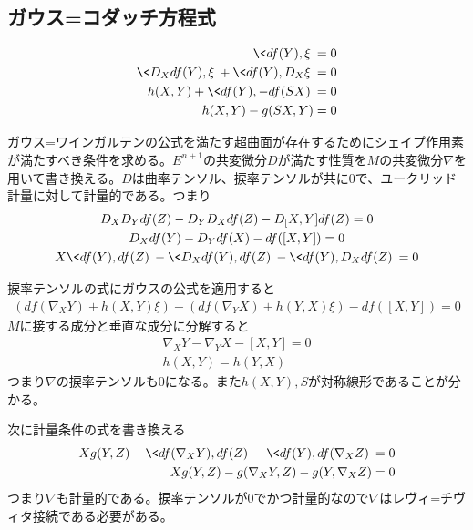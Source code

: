 \subsection{ガウス=コダッチ方程式}
    \begin{align*}
        \<df(Y), \xi\> = 0\\
        \<D_Xdf(Y), \xi\> + \<df(Y), D_X\xi\> = 0\\
        h(X, Y) + \<df(Y), -df(SX)\> = 0\\
        h(X, Y) - g(SX, Y) = 0
    \end{align*}

    ガウス=ワインガルテンの公式を満たす超曲面が存在するためにシェイプ作用素が満たすべき条件を求める。$E^{n+1}$の共変微分$D$が満たす性質を$M$の共変微分$\nabla$を用いて書き換える。$D$は曲率テンソル、捩率テンソルが共に0で、ユークリッド計量に対して計量的である。つまり
    \begin{gather*}
        D_XD_Ydf(Z) - D_YD_Xdf(Z) - D_[X, Y]df(Z) = 0\\
        D_Xdf(Y) - D_Ydf(X) - df([X, Y]) = 0\\
        X\<df(Y), df(Z)\> - \<D_Xdf(Y), df(Z)\> - \<df(Y), D_Xdf(Z)\> = 0\\
    \end{gather*}

    捩率テンソルの式にガウスの公式を適用すると
    \begin{align*}
        (df(\nabla_XY) + h(X, Y)\xi) - (df(\nabla_YX) + h(Y, X)\xi) - df([X, Y]) = 0
    \end{align*}
    $M$に接する成分と垂直な成分に分解すると
    \begin{gather*}
        \nabla_XY - \nabla_YX - [X, Y] = 0\\
        h(X, Y) = h(Y, X)
    \end{gather*}
    つまり$\nabla$の捩率テンソルも0になる。また$h(X, Y), S$が対称線形であることが分かる。

    次に計量条件の式を書き換える
    \begin{align*}
        Xg(Y, Z) - \<df(\nabla_XY), df(Z)\> - \<df(Y), df(\nabla_XZ)\> &= 0\\
        Xg(Y, Z) - g(\nabla_XY, Z) - g(Y, \nabla_XZ) &= 0
    \end{align*}
    つまり$\nabla$も計量的である。捩率テンソルが0でかつ計量的なので$\nabla$はレヴィ=チヴィタ接続である必要がある。

